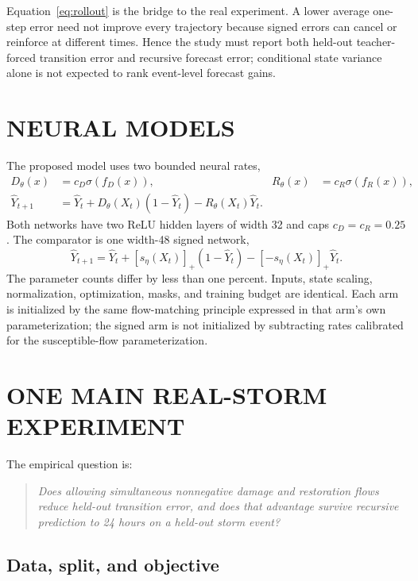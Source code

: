 \documentclass[twoside]{article}
\newcommand{\pos}[1]{[#1]_{+}}
\theoremstyle{plain}
\theoremstyle{definition}
\theoremstyle{remark}
\begin{document}
Equation~\eqref{eq:rollout} is the bridge to the real experiment. A lower
average one-step error need not improve every trajectory because signed errors
can cancel or reinforce at different times. Hence the study must report both
held-out teacher-forced transition error and recursive forecast error;
conditional state variance alone is not expected to rank event-level forecast
gains.

\section{NEURAL MODELS}

The proposed model uses two bounded neural rates,
\begin{align}
D_\theta(x)&=c_D\sigma(f_D(x)), &
R_\theta(x)&=c_R\sigma(f_R(x)),\nonumber\\
\widehat Y_{t+1}&=\widehat Y_t+D_\theta(X_t)(1-\widehat Y_t)
-R_\theta(X_t)\widehat Y_t.
\label{eq:twoNN}
\end{align}
Both networks have two ReLU hidden layers of width 32 and caps
\(c_D=c_R=0.25\). The comparator is one width-48 signed network,
\begin{equation}
\widehat Y_{t+1}=\widehat Y_t+
\pos{s_\eta(X_t)}(1-\widehat Y_t)-
\pos{-s_\eta(X_t)}\widehat Y_t.
\label{eq:oneNN}
\end{equation}
The parameter counts differ by less than one percent. Inputs, state scaling,
normalization, optimization, masks, and training budget are identical. Each arm
is initialized by the same flow-matching principle expressed in that arm's own
parameterization; the signed arm is not initialized by subtracting rates
calibrated for the susceptible-flow parameterization.

\section{ONE MAIN REAL-STORM EXPERIMENT}

The empirical question is:
\begin{quote}
\emph{Does allowing simultaneous nonnegative damage and restoration flows
reduce held-out transition error, and does that advantage survive recursive
prediction to 24 hours on a held-out storm event?}
\end{quote}

\subsection{Data, split, and objective}
\end{document}
